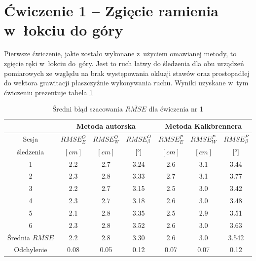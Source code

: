 \section*{Ćwiczenie 1 -- Zgięcie ramienia w~łokciu do góry}
Pierwsze ćwiczenie, jakie zostało wykonane z~użyciem omawianej metody, to zgięcie ręki w~łokciu do~góry. Jest to ruch łatwy do śledzenia dla obu urządzeń pomiarowych ze względu na brak występowania okluzji stawów oraz prostopadłej do wektora grawitacji płaszczyźnie wykonywania ruchu. Wyniki uzyskane w~tym ćwiczeniu prezentuje tabela \ref{tab:experiments:first:avg}
\begin{table}[!htp]
	\caption{Średni błąd szacowania $\overline{RMSE}$  dla ćwiczenia nr 1}
	\label{tab:experiments:first:avg}
	\noindent
	\tiny
	\centering
	\begin{tabular}{|c|c|c|c|c|c|c|}
		\hline 
		& \multicolumn{3}{c|}{Metoda autorska} & \multicolumn{3}{c|}{Metoda Kalkbrennera}  \\ 
		\hline 
		Sesja                      & $RMSE^O_E$ & $RMSE^O_W$ & $RMSE^O_\beta$ & $RMSE^P_E$ & $RMSE^P_W$ & $RMSE^P_\beta$ \\
		śledzenia                 & $[cm]$     & $[cm]$     & $[\degree]$    & $[cm]$     & $[cm]$     & $[\degree]$    \\
		\hline
		1                          & 2.2        & 2.7        & 3.24           & 2.6        & 3.1        & 3.44           \\
		2                          & 2.3        & 2.8        & 3.33           & 2.7        & 3.1        & 3.77           \\
		3                          & 2.2        & 2.7        & 3.15           & 2.5        & 3.0        & 3.42           \\
		4                          & 2.3        & 2.7        & 3.18           & 2.6        & 3.0        & 3.48           \\
		5                          & 2.1        & 2.8        & 3.35           & 2.5        & 2.9        & 3.51           \\
		6                          & 2.3        & 2.8        & 3.52           & 2.6        & 3.0        & 3.63           \\
		\hline
		Średnia $\overline{RMSE}$ & 2.2        & 2.8        & 3.30           & 2.6        & 3.0        & 3.542          \\
		Odchylenie                 & 0.08       & 0.05       & 0.12           & 0.07       & 0.07       & 0.12           \\
		\hline
	\end{tabular} 
								
\end{table} 

